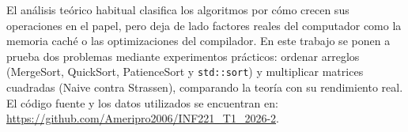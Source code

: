 El análisis teórico habitual clasifica los algoritmos por cómo crecen sus operaciones en el papel, pero deja de lado factores reales 
del computador como la memoria caché o las optimizaciones del compilador. En este trabajo se ponen a prueba dos problemas mediante experimentos 
prácticos: ordenar arreglos (MergeSort, QuickSort, PatienceSort y \texttt{std::sort}) y multiplicar matrices cuadradas (Naive contra Strassen), 
comparando la teoría con su rendimiento real. El código fuente y los datos utilizados se encuentran en: \url{https://github.com/Ameripro2006/INF221_T1_2026-2}.